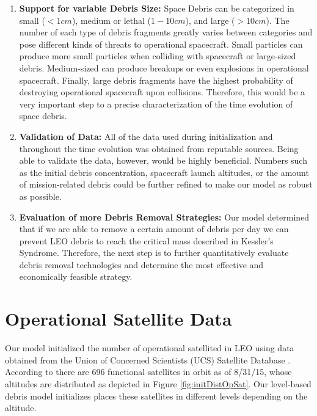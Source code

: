 \documentclass[pre,12pt]{revtex4-1}
\begin{document}
\begin{enumerate}
	\item \textbf{Support for variable Debris Size: }Space Debris can be categorized in small ($<1cm$), medium or lethal ($1-10cm$), and large ($>10cm$). The number of each type of debris fragments greatly varies between categories and pose different kinds of threats to operational spacecraft. Small particles can produce more small particles when colliding with spacecraft or large-sized debris. Medium-sized can produce breakups or even explosions in operational spacecraft. Finally, large debris fragments have the highest probability of destroying operational spacecraft upon collisions. Therefore, this would be a very important step to a precise characterization of the time evolution of space debris.
	\item \textbf{Validation of Data: }All of the data used during initialization and throughout the time evolution was obtained from reputable sources. Being able to validate the data, however, would be highly beneficial. Numbers such as the initial debris concentration, spacecraft launch altitudes, or the amount of mission-related debris could be further refined to make our model as robust as possible.
	\item \textbf{Evaluation of more Debris Removal Strategies: } Our model determined that if we are able to remove a certain amount of debris per day we can prevent LEO debris to reach the critical mass described in Kessler's Syndrome. Therefore, the next step is to further quantitatively evaluate debris removal technologies and determine the most effective and economically feasible strategy.  
\end{enumerate}


\clearpage




\clearpage
\appendix

\section{Operational Satellite Data}\label{AppendixA}

Our model initialized the number of operational satellited in LEO using data obtained from the Union of Concerned Scientists (UCS) Satellite Database \cite{satelliteDB}. According to \cite{satelliteDB} there are 696 functional satellites in orbit as of 8/31/15, whose altitudes are distributed as depicted in Figure \ref{fig:initDistOpSat}. Our level-based debris model initializes places these satellites in different levels depending on the altitude.
\end{document}
